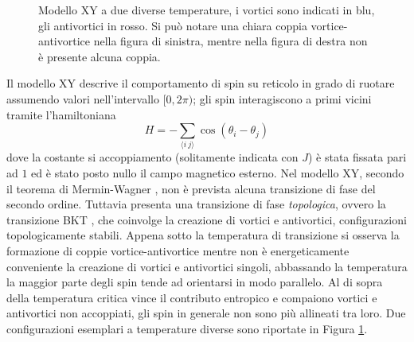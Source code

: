 \documentclass{article}
\begin{document}
\begin{figure}[ht]
{
}
\caption{Modello XY a due diverse temperature, i vortici sono indicati in blu, gli antivortici in rosso. Si può notare una chiara coppia vortice-antivortice nella figura di sinistra, mentre nella figura di destra non è presente alcuna coppia.}
\label{fig:xy}
\end{figure}

Il modello XY descrive il comportamento di spin su reticolo in grado di ruotare assumendo valori nell'intervallo $[0,2\pi)$; gli spin interagiscono a primi vicini tramite l'hamiltoniana
\begin{equation}
H=-\sum_{\langle i~j\rangle} \cos(\theta_i-\theta_j)
\end{equation}
dove la costante si accoppiamento (solitamente indicata con $J$) è stata fissata pari ad $1$ ed è stato posto nullo il campo magnetico esterno.
Nel modello XY,  secondo il teorema di Mermin-Wagner \cite{mermin}, non è prevista alcuna transizione di fase del secondo ordine.
Tuttavia presenta una transizione di fase \emph{topologica}, ovvero la transizione BKT \cite{kosterlitz}, che coinvolge la creazione di vortici e antivortici, configurazioni topologicamente stabili.
Appena sotto la temperatura di transizione si osserva la formazione di coppie vortice-antivortice mentre non è energeticamente conveniente la creazione di vortici e antivortici singoli, abbassando la temperatura la maggior parte degli spin tende ad orientarsi in modo parallelo.
Al di sopra della temperatura critica vince il contributo entropico e compaiono vortici e antivortici non accoppiati, gli spin in generale non sono più allineati tra loro.
Due configurazioni esemplari a temperature diverse sono riportate in Figura \ref{fig:xy}.
\end{document}
